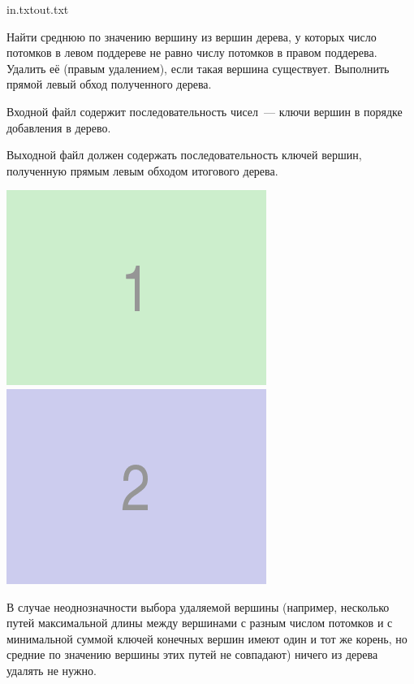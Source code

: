 \begin{rawproblem}{in.txt}{out.txt}

Найти среднюю по значению вершину из вершин дерева, у которых число потомков в левом поддереве
не равно числу потомков в правом поддерева.
Удалить её (правым удалением), если такая вершина существует.
Выполнить прямой левый обход полученного дерева.

\InputFile

Входной файл содержит последовательность чисел~--- ключи вершин в порядке добавления в дерево.

\OutputFile

Выходной файл должен содержать последовательность ключей вершин, полученную прямым левым обходом итогового дерева.

\Example

\begin{example}%
%
\end{example}%
\begin{center}%
    \includegraphics{static/fig1.png}\includegraphics{static/fig2.png}%
\end{center}%

\Note

В случае неоднозначности выбора удаляемой вершины (например, несколько путей 
максимальной длины между вершинами с разным числом потомков и с минимальной 
суммой ключей конечных вершин имеют один и тот же корень, но средние по 
значению вершины этих путей не совпадают) ничего из дерева удалять не нужно.

\end{rawproblem}
